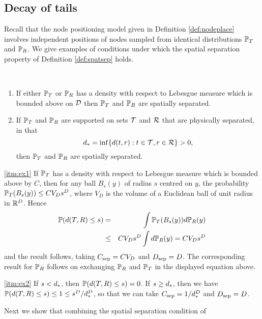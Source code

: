 \documentclass[journal]{IEEEtran}
\begin{document}
\subsection{Decay of tails} \label{sec:tails}
%
Recall that the node positioning model given in
Definition \ref{def:nodeplace} involves independent positions of nodes
sampled from identical distributions ${\mathbb {P}}_T$ and ${\mathbb {P}}_R$. We give examples
of conditions under which the spatial separation property of Definition
\ref{def:spatsep} holds.
%
\begin{lemma} \label{lem:spatsep} \mbox{ }
\begin{enumerate}
\item \label{itm:ex1}
If either ${\mathbb {P}}_T$ or ${\mathbb {P}}_R$ has a density with respect to Lebesgue measure
which is bounded above on ${\mathcal{D}}$ then ${\mathbb {P}}_T$ and ${\mathbb {P}}_R$ are spatially separated.
\item \label{itm:ex2}
If ${\mathbb {P}}_T$ and ${\mathbb {P}}_R$ are supported on sets ${\mathcal{T}}$ and ${\mathcal{R}}$ that 
are physically separated, in 
that 
$$ d_* = \inf \{ d( t, r): t \in {\mathcal{T}}, r \in {\mathcal{R}} \} > 0,$$
then ${\mathbb {P}}_T$ and ${\mathbb {P}}_R$ are spatially separated.
\end{enumerate}
\end{lemma}
\begin{IEEEproof}
\ref{itm:ex1}
If ${\mathbb {P}}_T$ has a density  with respect to Lebesgue measure which is bounded above
by $C$,
then for any ball $B_s(y)$ of radius $s$ centred on $y$, the probability ${\mathbb {P}}_T( B_s(y))
\leq C V_D s^D$, where $V_D$ is the volume of a Euclidean ball of unit radius
in ${\mathbb {R}}^D$.
Hence
\begin{eqnarray*}
{\mathbb {P}}( d(T,R) \leq s) & = & \int  {\mathbb {P}}_T( B_s(y)) d{\mathbb {P}}_R(y) \\
& \leq &  C V_D s^D 
\int d{\mathbb {P}}_R(y) = C V_D s^D 
\end{eqnarray*}
and the result follows,
taking $C_{\rm{sep}} = C V_D$ and $D_{\rm{sep}} = D$. The corresponding result for
${\mathbb {P}}_R$ follows on exchanging ${\mathbb {P}}_R$ and ${\mathbb {P}}_T$ in the displayed equation above.

\ref{itm:ex2} If $s < d_*$, then ${\mathbb {P}}(d(T,R) \leq s) = 0$.  If $s \geq d_*$, then we have
${\mathbb {P}}( d(T,R) \leq s) \leq 1 \leq s^D/d_*^D$, so that we can take $C_{\rm{sep}} = 1/d_*^D$
and $D_{\rm{sep}} = D$.
\end{IEEEproof}
%
Next we show that combining the spatial separation condition of
\end{document}
